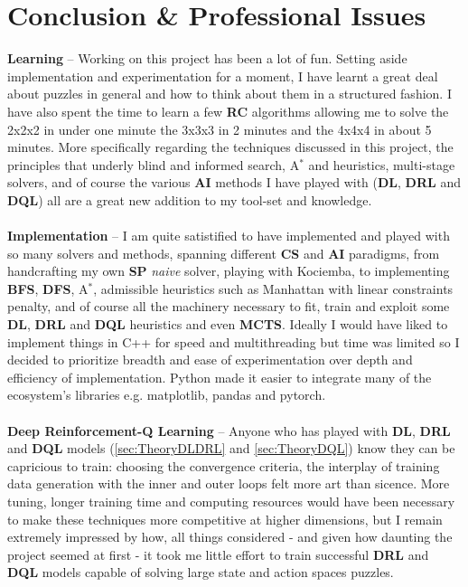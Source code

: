 
\chapter{Conclusion \& Professional Issues} %

\label{Conclusion} %



\textbf{Learning} -- Working on this project has been a lot of fun. Setting aside implementation and experimentation for a moment, I have learnt a great deal about puzzles in general and how to think about them in a structured fashion. I have also spent the time to learn a few \textbf{RC} algorithms allowing me to solve the 2x2x2 in under one minute the 3x3x3 in 2 minutes and the 4x4x4 in about 5 minutes. More specifically regarding the techniques discussed in this project, the principles that underly blind and informed search, A$^{*}$ and heuristics, multi-stage solvers, and of course the various \textbf{AI} methods I have played with (\textbf{DL}, \textbf{DRL} and \textbf{DQL}) all are a great new addition to my tool-set and knowledge.
\\
\\
\textbf{Implementation} -- I am quite satistified to have implemented and played with so many solvers and methods, spanning different \textbf{CS} and \textbf{AI} paradigms, from handcrafting my own \textbf{SP} \textit{naive} solver, playing with Kociemba, to implementing \textbf{BFS}, \textbf{DFS}, A$^{*}$, admissible heuristics such as Manhattan with linear constraints penalty, and of course all the machinery necessary to fit, train and exploit some \textbf{DL}, \textbf{DRL} and \textbf{DQL} heuristics and even \textbf{MCTS}. Ideally I would have liked to implement things in C++ for speed and multithreading but time was limited so I decided to prioritize breadth and ease of experimentation over depth and efficiency of implementation. Python made it easier to integrate many of the ecosystem's libraries e.g. matplotlib, pandas and pytorch.
\\
\\
\textbf{Deep Reinforcement-Q Learning} -- Anyone who has played with \textbf{DL}, \textbf{DRL} and \textbf{DQL} models (\ref{sec:TheoryDLDRL} and \ref{sec:TheoryDQL}) know they can be capricious to train: choosing the convergence criteria, the interplay of training data generation with the inner and outer loops felt more art than sicence. More tuning, longer training time and computing resources would have been necessary to make these techniques more competitive at higher dimensions, but I remain extremely impressed by how, all things considered - and given how daunting the project seemed at first - it took me little effort to train successful \textbf{DRL} and \textbf{DQL} models capable of solving large state and action spaces puzzles.
